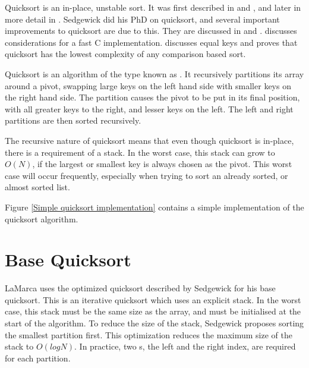 \label{quick}
Quicksort is an in-place, unstable sort. It was first described in
\cite{HoarePartition61} and \cite{HoareQuicksort61}, and later in more detail in
\cite{Hoare62}. Sedgewick did his PhD on quicksort, and several important
improvements to quicksort are due to this. They are discussed in
\cite{Sedgewick78} and \cite{Sedgewick02}. \cite{BentleyMcIlroy93} discusses
considerations for a fast C implementation. \cite{SedgewickBentley02} discusses
equal keys and proves that quicksort has the lowest complexity of any comparison
based sort.

Quicksort is an algorithm of the type known as . It
recursively partitions its array around a pivot, swapping large keys on
the left hand side with smaller keys on the right hand side. The partition
causes the pivot to be put in its final position, with all greater keys to the
right, and lesser keys on the left. The left and right partitions are then
sorted recursively.

The recursive nature of quicksort means that even though quicksort is in-place,
there is a requirement of a stack. In the worst case, this stack can grow to
$O(N)$, if the largest or smallest key is always chosen as the pivot. This
worst case will occur frequently, especially when trying to sort an already
sorted, or almost sorted list.

Figure \vref{Simple quicksort implementation} contains a simple implementation of
the quicksort algorithm.


\section{Base Quicksort}

LaMarca uses the optimized quicksort described by Sedgewick for his base
quicksort. This is an iterative quicksort which uses an explicit stack. In the
worst case, this stack must be the same size as the array, and must be
initialised at the start of the algorithm. To reduce the size of the stack,
Sedgewick proposes sorting the smallest partition first. This optimization
reduces the maximum size of the stack to $O(logN)$. In practice, two s,
the left and the right index, are required for each partition.

